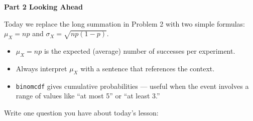 \documentclass[10pt]{article}
\begin{document}
\vspace{0.2in}

{\large\bfseries\color{navy} Part 2 \quad Looking Ahead}

\vspace{0.12in}

\noindent Today we replace the long summation in Problem 2 with two simple formulas:
$\mu_X = np$ and $\sigma_X = \sqrt{np(1-p)}$.

\vspace{0.14in}

\begin{tcolorbox}[colback=greenbg, colframe=greenacc, boxrule=0.8pt, arc=2mm,
    left=4mm, right=4mm, top=3mm, bottom=3mm]
    \small
    \begin{itemize}[leftmargin=1.3em, itemsep=8pt]
  \item $\mu_X = np$ is the expected (average) number of successes per experiment.
  \item Always interpret $\mu_X$ with a sentence that references the context.
  \item \texttt{binomcdf} gives cumulative probabilities --- useful when the event
        involves a range of values like ``at most 5'' or ``at least 3.''
    \end{itemize}
\end{tcolorbox}

\vspace{0.18in}

\noindent\textcolor{slate}{\small Write one question you have about today's lesson:}\\[8pt]
\writeline\\[2pt]\writeline
\end{document}
